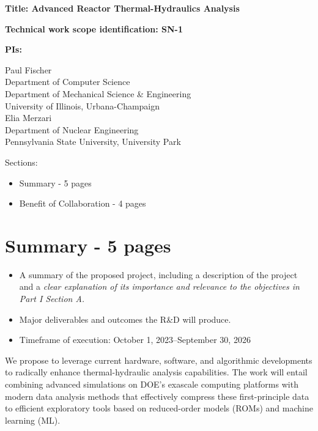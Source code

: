 
\parindent 0in
\parskip 0.1in

{\bf Title: Advanced Reactor Thermal-Hydraulics Analysis}

{\bf Technical work scope identification: SN-1}

{\bf PIs:}

Paul Fischer \\
Department of Computer Science \\
Department of Mechanical Science \& Engineering \\
University of Illinois, Urbana-Champaign \\[2ex]

Elia Merzari \\
Department of Nuclear Engineering \\
Pennsylvania State University, University Park

Sections:
\begin{itemize}
\item{Summary - 5 pages}
\item{Benefit of Collaboration - 4 pages}
\end{itemize}



\section{Summary - 5 pages}

\begin{itemize}
\item
A summary of the proposed project, including a description of the project and a
{\em clear explanation of its importance and relevance to the objectives in Part I
Section A.}
\item
Major deliverables and outcomes the R\&D will produce.
\item
Timeframe of execution: October 1, 2023--September 30, 2026
\end{itemize}


We propose to leverage current hardware, software, and algorithmic developments
to radically enhance thermal-hydraulic analysis capabilities.  The work will
entail combining advanced simulations on DOE's exascale computing platforms
with modern data analysis methods that effectively compress these
first-principle data to efficient exploratory tools based on reduced-order
models (ROMs) and machine learning (ML).

